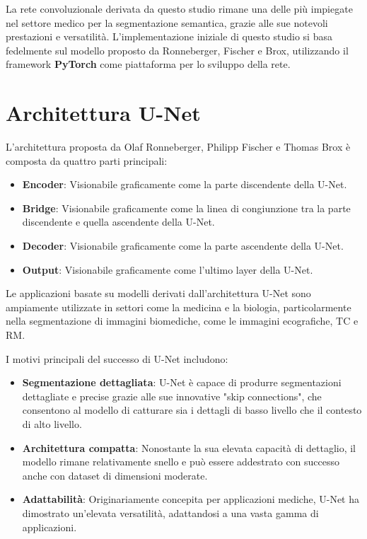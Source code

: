 La rete convoluzionale derivata da questo studio rimane una delle più impiegate nel settore medico
per la segmentazione semantica, grazie alle sue notevoli prestazioni e versatilità.
L'implementazione iniziale di questo studio si basa fedelmente sul modello proposto da Ronneberger,
Fischer e Brox, utilizzando il framework \textbf{PyTorch} \cite{pytorch} come piattaforma per lo
sviluppo della rete.


\section{Architettura U-Net}

L'architettura proposta da Olaf Ronneberger, Philipp Fischer e Thomas Brox è composta da quattro
parti principali: 
\begin{itemize} 
    \item \textbf{Encoder}: Visionabile graficamente come la parte discendente della U-Net.
    \item \textbf{Bridge}: Visionabile graficamente come la linea di congiunzione tra la parte
        discendente e quella ascendente della U-Net.
    \item \textbf{Decoder}: Visionabile graficamente come la parte ascendente della U-Net.
    \item \textbf{Output}: Visionabile graficamente come l'ultimo layer della U-Net.
\end{itemize}

Le applicazioni basate su modelli derivati dall'architettura U-Net sono ampiamente utilizzate in settori come la medicina e la biologia, particolarmente nella segmentazione di immagini biomediche, come le immagini ecografiche, TC e RM.

I motivi principali del successo di U-Net includono:
\begin{itemize} 
    \item \textbf{Segmentazione dettagliata}: U-Net è capace di produrre segmentazioni dettagliate e
        precise grazie alle sue innovative "skip connections", che consentono al modello di
        catturare sia i dettagli di basso livello che il contesto di alto livello.
    \item \textbf{Architettura compatta}: Nonostante la sua elevata capacità di dettaglio, il
        modello rimane relativamente snello e può essere addestrato con successo anche con dataset
        di dimensioni moderate.
    \item \textbf{Adattabilità}: Originariamente concepita per applicazioni mediche, U-Net ha
        dimostrato un'elevata versatilità, adattandosi a una vasta gamma di applicazioni.
\end{itemize}

